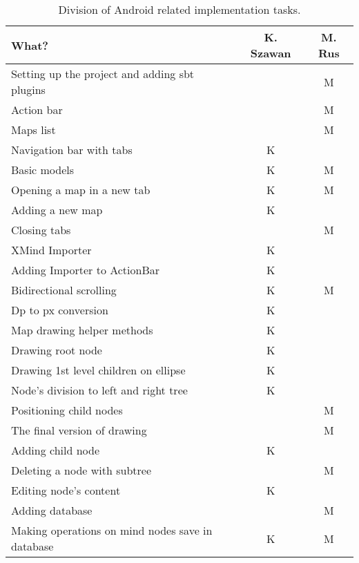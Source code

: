 \begin{table}[h]
	\centering
	\begin{tabular}{l|c|c}
		What? & K. Szawan & M. Rus \\
		\hline
		Setting up the project and adding sbt plugins &  & M \\
		Action bar & & M\\
		Maps list & & M\\
		Navigation bar with tabs & K & \\
		Basic models & K & M\\
		Opening a map in a new tab & K & M\\
		Adding a new map & K & \\
		Closing tabs & & M\\
		XMind Importer & K & \\
		Adding Importer to ActionBar & K & \\
	    Bidirectional scrolling & K & M \\
	    Dp to px conversion & K & \\
	    Map drawing helper methods  & K & \\
	    Drawing root node & K & \\
	    Drawing 1st level children on ellipse & K & \\
	    Node's division to left and right tree & K & \\
	    Positioning child nodes & & M \\
	    The final version of drawing & & M \\
	    Adding child node & K & \\
	    Deleting a node with subtree &  & M \\
	    Editing node's content &  K & \\
	    Adding database &  & M \\
	    Making operations on mind nodes save in database & K & M \\
	\end{tabular}
	\caption{Division of Android related implementation tasks.}
	\label{tab:who-did-impl}
\end{table}

